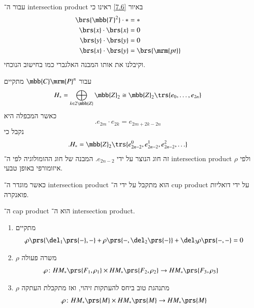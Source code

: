 \documentclass[a4paper,10pt,twoside,openany]{book}
\begin{document}
\begin{remark}
עבור ה־%
\textenglish{intersection product}
באיור
\ref{7.6}
ראינו כי
\begin{align*}
\brs{\mbb{T}^2} \cdot  * &= * \\
\brs{x} \cdot \brs{x} &= 0 \\
\brs{y} \cdot \brs{y} &= 0 \\
\brs{x} \cdot \brs{y} &= \brs{\mrm{pt}}
\end{align*}
וקיבלנו את אותו המבנה האלגברי כמו בחישוב הנוכחי.
\end{remark}

\begin{example}
עבור
$\mbb{C}\mrm{P}^n$
מתקיים
\begin{align*}
H_* = \bigoplus_{k \in 2 \mbb{Z}} \mbb{Z}_2 \cong \mbb{Z}_2\trs{e_0, \ldots, e_{2n}}
\end{align*}
כאשר המכפלה היא
\[\text{.} e_{2m} \cdot e_{2k} = e_{2m + 2k - 2n}\]
נקבל כי
\[\text{.} H_* = \mbb{Z}_2 \trs{e_{2n - 2}^0, e_{2n - 2}^1, e_{2n - 2}^2, \ldots}\]
זה חוג הנוצר על ידי
$e_{2n - 2}$.
המבנה של חוג ההומולוגיה לפי ה־%
\textenglish{intersection product}
ולפי
$\rho$
איזומורפי באופן טבעי.
\end{example}

\begin{remark}
כאשר מוגדר ה־%
\textenglish{intersection product}
הוא מתקבל על ידי ה־%
\textenglish{cup product}
על ידי דואליות פואנקרה.

ה־%
\textenglish{cap product}
הוא ה־%
\textenglish{intersection product}.
\end{remark}

\begin{proposition}
\begin{enumerate}
\item מתקיים
\[\text{.} \rho\prs{\del_1\prs{-}, -} + \rho\prs{-, \del_2\prs{-}} + \del_3 \rho\prs{-,-} = 0\]

\item $\rho$
משרה פעולה
\begin{align*}
\text{.} \rho \colon HM_*\prs{F_1, \rho_1} \times HM_*\prs{F_2, \rho_2} &\to HM_*\prs{F_3, \rho_3}
\end{align*}

\item $\rho$
מתנהגת טוב ביחס להעתקות זיהוי, ואז מתקבלת העתקה
\[\text{.} \rho \colon HM_*\prs{M} \times HM_*\prs{M} \to HM_*\prs{M} \]
\end{enumerate}
\end{proposition}
\end{document}
